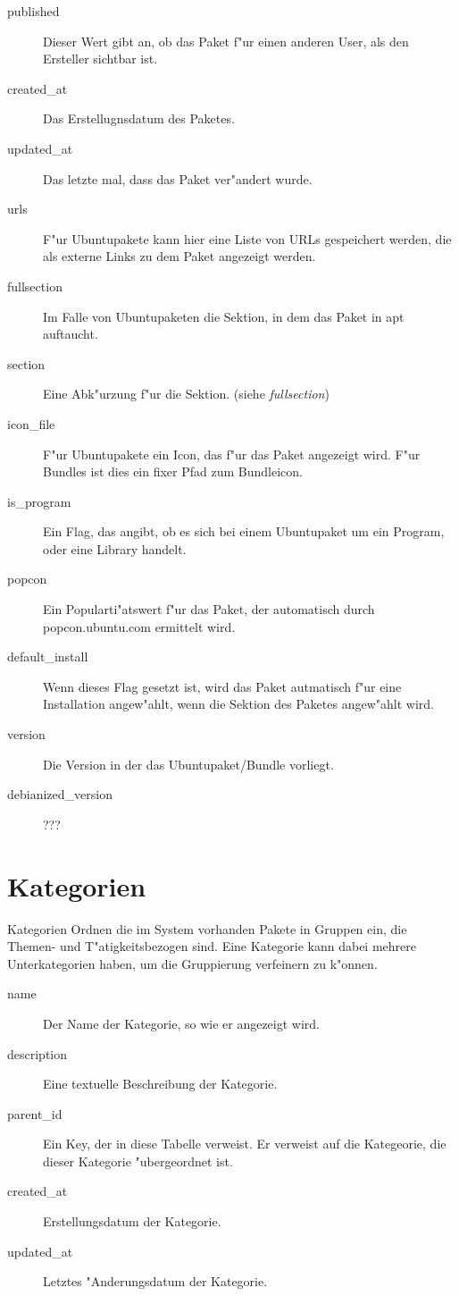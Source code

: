 \documentclass{article}
\begin{document}
\begin{description}
\item[published] Dieser Wert gibt an, ob das Paket f"ur einen anderen User, als den Ersteller sichtbar ist.
\item[created\_at] Das Erstellugnsdatum des Paketes.
\item[updated\_at] Das letzte mal, dass das Paket ver"andert wurde.
\item[urls] F"ur Ubuntupakete kann hier eine Liste von URLs gespeichert werden, die als externe Links zu dem Paket angezeigt werden.
\item[fullsection] Im Falle von Ubuntupaketen die Sektion, in dem das Paket in apt auftaucht.
\item[section] Eine Abk"urzung f"ur die Sektion. (siehe \emph{fullsection})
\item[icon\_file] F"ur Ubuntupakete ein Icon, das f"ur das Paket angezeigt wird. F"ur Bundles ist dies ein fixer Pfad zum Bundleicon.
\item[is\_program] Ein Flag, das angibt, ob es sich bei einem Ubuntupaket um ein Program, oder eine Library handelt.
\item[popcon] Ein Popularti"atswert f"ur das Paket, der automatisch durch popcon.ubuntu.com ermittelt wird.
\item[default\_install] Wenn dieses Flag gesetzt ist, wird das Paket autmatisch f"ur eine Installation angew"ahlt, wenn die Sektion des Paketes angew"ahlt wird.
\item[version] Die Version in der das Ubuntupaket/Bundle vorliegt.
\item[debianized\_version] ???

\end{description}

\section{Kategorien}
\label{categories}

Kategorien Ordnen die im System vorhanden Pakete in Gruppen ein, die Themen- und T"atigkeitsbezogen sind. Eine Kategorie kann dabei mehrere Unterkategorien haben, um die Gruppierung verfeinern zu k"onnen.

\begin{description}
\item[name] Der Name der Kategorie, so wie er angezeigt wird.
\item[description] Eine textuelle Beschreibung der Kategorie.
\item[parent\_id] Ein Key, der in diese Tabelle verweist. Er verweist auf die Kategeorie, die dieser Kategorie "ubergeordnet ist.
\item[created\_at] Erstellungsdatum der Kategorie.
\item[updated\_at] Letztes "Anderungsdatum der Kategorie.
\end{description}
\end{document}
